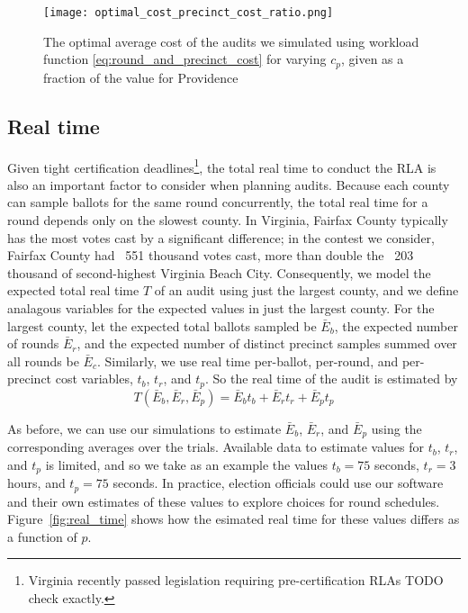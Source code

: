 \begin{figure}
\texttt{[image: optimal\_cost\_precinct\_cost\_ratio.png]}
\caption{The optimal average cost of the audits we simulated using workload function \ref{eq:round_and_precinct_cost} for varying $c_p$, given as a fraction of the value for Providence}
\label{fig:optimal_cost_precinct_cost_ratio}
\end{figure}


\subsection{Real time}
Given tight certification deadlines\footnote{Virginia recently passed legislation requiring pre-certification RLAs TODO check exactly.}, the total real time to conduct the RLA is also an important factor to consider when planning audits.
Because each county can sample ballots for the same round concurrently, the total real time for a round depends only on the slowest county. 
In Virginia, Fairfax County typically has the most votes cast by a significant difference; in the contest we consider, Fairfax County had ~551 thousand votes cast, more than double the ~203 thousand of second-highest Virginia Beach City.
Consequently, we model the expected total real time $T$ of an audit using just the largest county, and we define analagous variables for the expected values in just the largest county.
For the largest county, let the expected total ballots sampled be $\bar E_b$, the expected number of rounds $\bar E_r$, and the expected number of distinct precinct samples summed over all rounds be $\bar E_c$.
Similarly, we use real time per-ballot, per-round, and per-precinct cost variables, $t_b$, $t_r$, and $t_p$. So the real time of the audit is estimated by
\begin{equation}
T(\bar E_b, \bar E_r, \bar E_p ) = \bar E_b t_b + \bar E_r t_r + \bar E_p t_p
\label{eq:real_time}
\end{equation}

As before, we can use our simulations to estimate $\bar E_b$, $\bar E_r$, and $\bar E_p$ using the corresponding averages over the trials. 
Available data to estimate values for $t_b$, $t_r$, and $t_p$ is limited, and so we take as an example the values $t_b=75$ seconds, $t_r=3$ hours, and $t_p=75$ seconds. In practice, election officials could use our software and their own estimates of these values to explore choices for round schedules. Figure~\ref{fig:real_time} shows how the esimated real time for these values differs as a function of $p$. 

